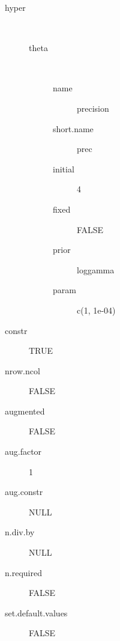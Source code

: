 \begin{description}
	\item[hyper]\ 
	 \begin{description}
	 	\item[theta]\ 
	 	 \begin{description}
	 	 	 \item[ name ] precision 
	 	 	 \item[ short.name ] prec 
	 	 	 \item[ initial ] 4 
	 	 	 \item[ fixed ] FALSE 
	 	 	 \item[ prior ] loggamma 
	 	 	 \item[ param ] c(1, 1e-04) 
	 	 \end{description}
	 \end{description}
	 \item[ constr ] TRUE 
	 \item[ nrow.ncol ] FALSE 
	 \item[ augmented ] FALSE 
	 \item[ aug.factor ] 1 
	 \item[ aug.constr ] NULL 
	 \item[ n.div.by ] NULL 
	 \item[ n.required ] FALSE 
	 \item[ set.default.values ] FALSE 
\end{description}

